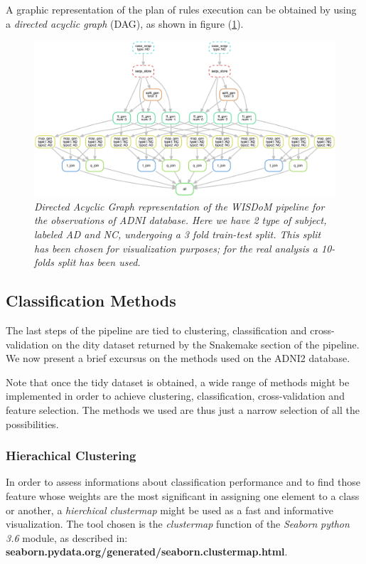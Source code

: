\documentclass[12pt,openright,twoside,a4paper]{book}
\begin{document}
A graphic representation of the plan of rules execution can be obtained by using a \textit{directed acyclic graph} (DAG), as shown in figure (\ref{dag}).

\clearpage

\begin{figure}[!h]
\centering
\includegraphics[scale=0.53, angle=270]{dag}
\caption{\textit{Directed Acyclic Graph representation of the WISDoM pipeline for the observations of ADNI database. Here we have 2 type of subject, labeled AD and NC, undergoing a 3 fold train-test split. This split has been chosen for visualization purposes; for the real analysis a 10-folds split has been used.}}
\label{dag}
\end{figure}

\subsection{Classification Methods}

The last steps of the pipeline are tied to clustering, classification and cross-validation on the dity dataset returned by the Snakemake section of the pipeline.
We now present a brief excursus on the methods used on the ADNI2 database.

Note that once the tidy dataset \cite{tidydata} is obtained, a wide range of methods might be implemented in order to achieve clustering, classification, cross-validation and feature selection.
The methods we used are thus just a narrow selection of all the possibilities.

\subsubsection*{Hierachical Clustering}

In order to assess informations about classification performance and to find those feature whose weights are the most significant in assigning one element to a class or another, a \textit{hierchical clustermap} might be used as a fast and informative visualization.
The tool chosen is the \textit{clustermap} function of the \textit{Seaborn} \textit{python 3.6} module, as described in:\\ \textbf{seaborn.pydata.org/generated/seaborn.clustermap.html}.
\end{document}
